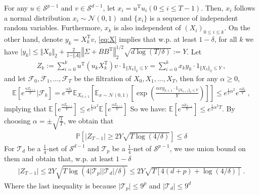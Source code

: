 \documentclass{article}
\theoremstyle{definition}
\begin{document}
For any $u\in\mathcal{S}^{p-1}$ and $v\in\mathcal{S}^{d-1}$, let $x_{i}=u^{\mathrm{T}}u_{i}(0\leq i\leq T-1)$. Then, $x_{i}$ follows a normal distribution $x_{i}\sim\mathcal{N}(0,1)$ and $\{x_{i}\}$ is a sequence of independent random variables. Furthermore, $x_{k}$ is also independent of $(X_{i})_{0\leq i\leq k}$. On the other hand, denote $y_{k}=X^{\mathrm{T}}_{k}v$, \eqref{eq:X} implies that w.p. at least $1-\delta$, for all $k$ we have
$\vert y_{k}\vert \leq \Vert X_{0}\Vert _{2}+\frac{2}{1-\Vert A\Vert }\left\Vert\Sigma+BB^{\mathrm{T}}\right\Vert^{1/2}_{2}\sqrt{d\log(T/\delta)}:=Y$. Let 
\begin{align*}
Z_{k}:=\sum_{i=0}^{k}u^{\mathrm{T}}\left(u_{k}X^{\mathrm{T}}_{k}\right)v\cdot 1_{\Vert X_{k}\Vert _{2}\leq Y}=\sum_{i=0}^{k}x_{k}y_{k}\cdot1_{\Vert X_{k}\Vert _{2}\leq Y}\,,  
\end{align*}
and let $\mathcal{F}_{0},\mathcal{F}_{1},...,\mathcal{F}_{T}$ be the filtration of $X_{0},X_{1},...,X_{T}$,  then for any $\alpha\geq 0$,
\begin{align*}
\mathbb{E}\left[e^{\frac{\alpha Z_{k+1}}{Y}}\vert \mathcal{F}_{k}\right]= e^{\frac{\alpha Z_{k}}{Y}}\mathbb{E}_{X_{k+1}}\left[\mathbb{E}_{x\sim\mathcal{N}(0,1)}\left[\exp\left(\frac{\alpha xy_{k+1}\cdot 1_{\Vert X_{k+1}\Vert _{2}\leq Y}}{Y}\right)\right]\right]\leq e^{\frac{1}{2}\alpha^{2}}e^{\frac{\alpha Z_{k}}{Y}}\,,
\end{align*}
implying that $\mathbb{E}\left[e^{\frac{\alpha Z_{k+1}}{Y}}\right]\leq e^{\frac{1}{2}\alpha^{2}}\mathbb{E}\left[e^{\frac{\alpha Z_{k+1}}{Y}}\right] $
So we have: $\mathbb{E}\left[e^{\frac{\alpha Z_{T-1}}{Y}}\right]\leq e^{\frac{1}{2}\alpha^{2}T}$.
By choosing $\alpha = \pm \sqrt{\frac{1}{T}}$, we obtain that
\begin{align*}
\mathbb{P}\left[\vert Z_{T-1}\vert\geq 2Y\sqrt{T\log(4/\delta)}\right]\leq \delta
\end{align*}
For $\mathcal{T}_{d}$ be a $\frac{1}{4}$-net of $\mathcal{S}^{d-1}$ and $\mathcal{T}_{p}$ be a $\frac{1}{4}$-net of $\mathcal{S}^{p-1}$, we use union bound on them and obtain that, w.p. at least $1-\delta$
\begin{align*}
\vert Z_{T-1}\vert \leq 2Y\sqrt{T\log(4\vert \mathcal{T}_{p}\vert \vert \mathcal{T}_{d}\vert/\delta )}\leq 2Y\sqrt{T[4(d+p)+\log(4/\delta)]}\,.
\end{align*}
Where the last inequality is because $\vert \mathcal{T}_{p}\vert \leq 9^{p}$ and $\vert \mathcal{T}_{d}\vert \leq 9^{d}$
\end{document}
